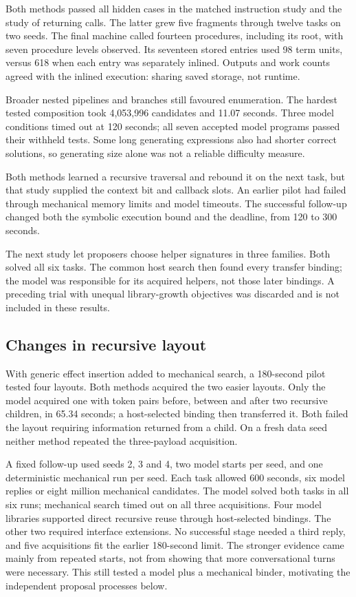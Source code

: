Both methods passed all hidden cases in the matched instruction study and the
study of returning calls. The latter grew five fragments through twelve tasks
on two seeds. The final machine called fourteen procedures, including its root, with
seven procedure levels observed. Its seventeen stored entries used 98 term
units, versus 618 when each entry was separately inlined. Outputs and work
counts agreed with the inlined execution: sharing saved storage, not runtime.

Broader nested pipelines and branches still favoured enumeration. The hardest
tested composition took 4,053,996 candidates and 11.07 seconds. Three model
conditions timed out at 120 seconds; all seven accepted model programs passed
their withheld tests. Some long generating expressions also had shorter correct
solutions, so generating size alone was not a reliable difficulty measure.

Both methods learned a recursive traversal and rebound it on the next task,
but that study supplied the context bit and callback slots. An earlier pilot
had failed through mechanical memory limits and model timeouts. The successful
follow-up changed both the symbolic execution bound and the deadline, from
120 to 300 seconds.

The next study let proposers choose helper signatures in three families. Both
solved all six tasks. The common host search then found every transfer binding;
the model was responsible for its acquired helpers, not those later bindings.
A preceding trial with unequal library-growth objectives was discarded and is
not included in these results.

\subsection{Changes in recursive layout}

With generic effect insertion added to mechanical search, a 180-second pilot
tested four layouts. Both methods acquired the two easier layouts. Only the
model acquired one with token pairs before, between and after two recursive
children, in 65.34 seconds; a host-selected binding then transferred it.
Both failed the layout requiring information returned from a child. On a
fresh data seed neither method repeated the three-payload acquisition.

A fixed follow-up used seeds 2, 3 and 4, two model starts per seed, and one
deterministic mechanical run per seed. Each task allowed 600 seconds, six
model replies or eight million mechanical candidates. The model solved both
tasks in all six runs; mechanical search timed out on all three acquisitions.
Four model libraries supported direct recursive reuse through host-selected
bindings. The other two required interface extensions. No successful stage
needed a third reply, and five acquisitions fit the earlier 180-second limit.
The stronger evidence came mainly from repeated starts, not from showing that
more conversational turns were necessary. This still tested a model plus a
mechanical binder, motivating the independent proposal processes below.

